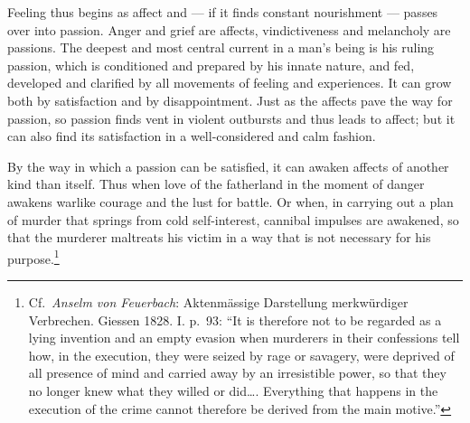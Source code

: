 \documentclass[12pt,a4paper]{book}
\newcommand{\opage}[1]{\marginnote{\footnotesize\textit{[#1]}}}
\begin{document}
Feeling thus begins as affect and --- if it finds constant nourishment
--- passes over into passion. Anger and grief are affects, vindictiveness
and melancholy are passions. The deepest and most central current in a
man's being is his ruling passion, which is conditioned and prepared by
his innate nature, and fed, developed and clarified by all movements of
feeling and experiences. It can grow both by satisfaction and by
disappointment. Just as the affects pave the way for passion, so passion
finds vent in violent outbursts and thus leads to affect; but it can
also find its satisfaction in a well-considered and calm fashion.

By the way in which a passion can be satisfied, it can awaken affects of
another kind than itself. Thus when love of the fatherland in the moment
of danger awakens
\opage{335}warlike courage and the lust for battle. Or when, in carrying
out a plan of murder that springs from cold self-interest, cannibal
impulses are awakened, so that the murderer maltreats his victim in a
way that is not necessary for his purpose.\footnote{Cf.\ \emph{Anselm
von Feuerbach}: Aktenmässige Darstellung merkwürdiger Verbrechen.
Giessen 1828. I. p.~93: ``It is therefore not to be regarded as a lying
invention and an empty evasion when murderers in their confessions tell
how, in the execution, they were seized by rage or savagery, were
deprived of all presence of mind and carried away by an irresistible
power, so that they no longer knew what they willed or did\ldots.
Everything that happens in the execution of the crime cannot therefore
be derived from the main motive.''}
\end{document}
